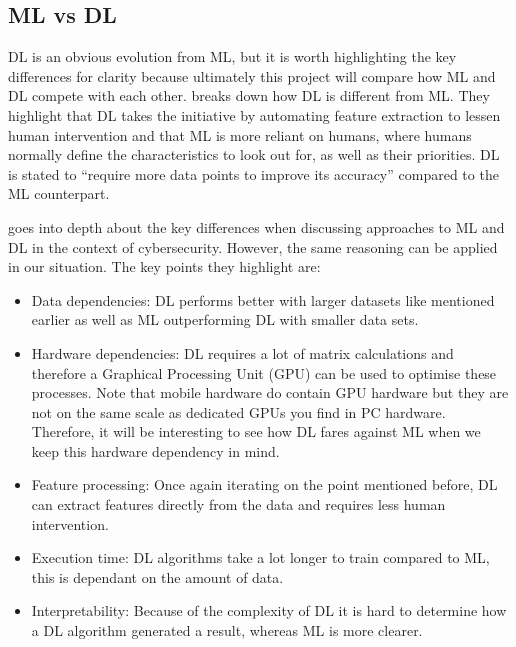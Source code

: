 \documentclass[12pt,a4paper]{report}
\begin{document}
\subsection{ML vs DL}
\label{subsec:mlvsdl}

DL is an obvious evolution from ML, but it is worth highlighting the key differences for clarity because ultimately this 
project will compare how ML and DL compete with each other. \citet{kav2020} breaks down how DL is different 
from ML. They highlight that DL takes the initiative by automating feature extraction to lessen human intervention and 
that ML is more reliant on humans, where humans normally define the characteristics to look out for, as well as their 
priorities. DL is stated to “require more data points to improve its accuracy” compared to the ML counterpart.

\par

\citet{8359287} goes into depth about the key differences when discussing approaches to ML and DL in the 
context of cybersecurity. However, the same reasoning can be applied in our situation. The key points they highlight 
are:

\begin{itemize}
    \item Data dependencies: DL performs better with larger datasets like mentioned earlier as well as ML 
    outperforming DL with smaller data sets.
    \item Hardware dependencies: DL requires a lot of matrix calculations and therefore a Graphical Processing 
    Unit (GPU) can be used to optimise these processes. Note that mobile hardware do contain GPU hardware but they are
    not on the same scale as dedicated GPUs you find in PC hardware. Therefore, it will be interesting to see how DL 
    fares against ML when we keep this hardware dependency in mind.
    \item Feature processing: Once again iterating on the point mentioned before, DL can extract features directly 
    from the data and requires less human intervention.
    \item Execution time: DL algorithms take a lot longer to train compared to ML, this is dependant on the amount of 
    data.
    \item Interpretability: Because of the complexity of DL it is hard to determine how a DL algorithm generated a 
    result, whereas ML is more clearer.
\end{itemize}
\end{document}
